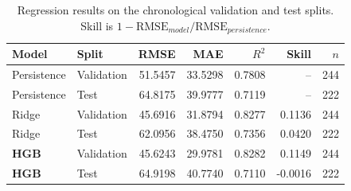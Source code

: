 \begin{table}[htbp]
\centering
\small
\caption{Regression results on the chronological validation and test splits. Skill is $1-\mathrm{RMSE}_{model}/\mathrm{RMSE}_{persistence}$.}
\label{tab:reg-metrics}
\begin{tabular}{llrrrrr}
\toprule
Model & Split & RMSE & MAE & $R^2$ & Skill & $n$ \\
\midrule
Persistence & Validation & 51.5457 & 33.5298 & 0.7808 & -- & 244 \\
Persistence & Test & 64.8175 & 39.9777 & 0.7119 & -- & 222 \\
Ridge & Validation & 45.6916 & 31.8794 & 0.8277 & 0.1136 & 244 \\
Ridge & Test & 62.0956 & 38.4750 & 0.7356 & 0.0420 & 222 \\
\textbf{HGB} & Validation & 45.6243 & 29.9781 & 0.8282 & 0.1149 & 244 \\
\textbf{HGB} & Test & 64.9198 & 40.7740 & 0.7110 & -0.0016 & 222 \\
\bottomrule
\end{tabular}

\end{table}
